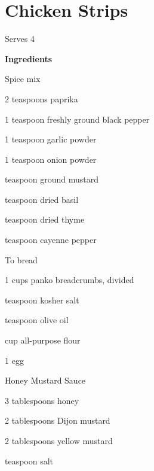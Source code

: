 \documentclass[../book.tex]{subfiles}
\begin{document}
\section{Chicken Strips}

{\sffamily Serves 4}\vspace{1ex}

	\begin{minipage}[t]{0.35\textwidth}
  {\large\bfseries Ingredients}
		\begin{mydesc}
			\item[Spice mix]\hfill
				\begin{mying}
					\item 2 teaspoons paprika
					\item 1 teaspoon freshly ground black pepper
					\item 1 teaspoon garlic powder
					\item 1 teaspoon onion powder
					\item {} teaspoon ground mustard
					\item {} teaspoon dried basil
					\item {} teaspoon dried thyme
					\item {} teaspoon cayenne pepper%
				\end{mying}
			\item[To bread]\hfill
				\begin{mying}
					\item 1 cups panko breadcrumbs, divided
					\item {} teaspoon kosher salt
					\item {} teaspoon olive oil
					\item {} cup all-purpose flour%
					\item 1 egg
				\end{mying}
			\item[Honey Mustard Sauce]\hfill
				\begin{mying}
					\item 3 tablespoons honey
					\item 2 tablespoons Dijon mustard
					\item 2 tablespoons yellow mustard
					\item {} teaspoon salt
				\end{mying}
		\end{mydesc}
		\vspace{2mm}
	\end{minipage}
\end{document}
